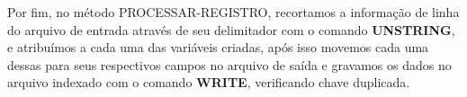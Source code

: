 Por fim, no método PROCESSAR-REGISTRO, recortamos a informação de linha do arquivo de entrada através de seu delimitador com o comando \textbf{UNSTRING}, e atribuímos a cada uma das variáveis criadas, após isso movemos cada uma dessas para seus respectivos campos no arquivo de saída e gravamos os dados no arquivo indexado com o comando \textbf{WRITE}, verificando chave duplicada.

\clearpage